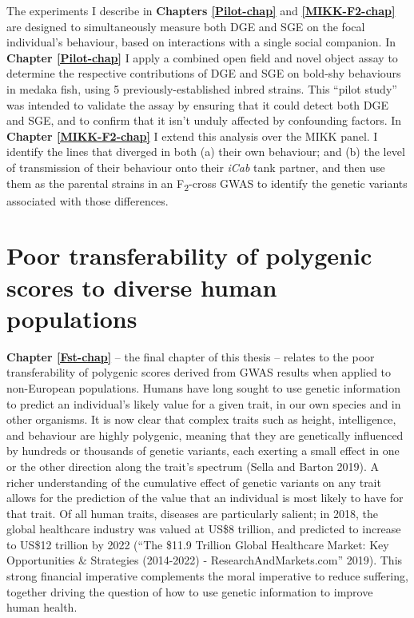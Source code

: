 \documentclass[
]{book}
\begin{document}
The experiments I describe in \textbf{Chapters \ref{Pilot-chap}} and \textbf{\ref{MIKK-F2-chap}} are designed to simultaneously measure both DGE and SGE on the focal individual's behaviour, based on interactions with a single social companion. In \textbf{Chapter \ref{Pilot-chap}} I apply a combined open field and novel object assay to determine the respective contributions of DGE and SGE on bold-shy behaviours in medaka fish, using 5 previously-established inbred strains. This ``pilot study'' was intended to validate the assay by ensuring that it could detect both DGE and SGE, and to confirm that it isn't unduly affected by confounding factors. In \textbf{Chapter \ref{MIKK-F2-chap}} I extend this analysis over the MIKK panel. I identify the lines that diverged in both (a) their own behaviour; and (b) the level of transmission of their behaviour onto their \emph{\textcolor{iCab_424B4D}{iCab}} tank partner, and then use them as the parental strains in an F\textsubscript{2}-cross GWAS to identify the genetic variants associated with those differences.

\hypertarget{Fst-intro}{%
\section{Poor transferability of polygenic scores to diverse human populations}\label{Fst-intro}}

\textbf{Chapter \ref{Fst-chap}} -- the final chapter of this thesis -- relates to the poor transferability of polygenic scores derived from GWAS results when applied to non-European populations. Humans have long sought to use genetic information to predict an individual's likely value for a given trait, in our own species and in other organisms. It is now clear that complex traits such as height, intelligence, and behaviour are highly polygenic, meaning that they are genetically influenced by hundreds or thousands of genetic variants, each exerting a small effect in one or the other direction along the trait's spectrum (Sella and Barton 2019). A richer understanding of the cumulative effect of genetic variants on any trait allows for the prediction of the value that an individual is most likely to have for that trait. Of all human traits, diseases are particularly salient; in 2018, the global healthcare industry was valued at US\$8 trillion, and predicted to increase to US\$12 trillion by 2022 ({``The \$11.9 {Trillion Global Healthcare Market}: {Key Opportunities} \& {Strategies} (2014-2022) - {ResearchAndMarkets}.com''} 2019). This strong financial imperative complements the moral imperative to reduce suffering, together driving the question of how to use genetic information to improve human health.
\end{document}
